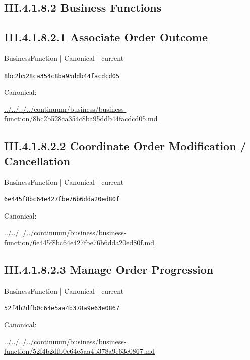 \documentclass[10pt,a4paper]{article}
\begin{document}
\subsection*{III.4.1.8.2 Business Functions}
\subsection*{III.4.1.8.2.1 Associate Order Outcome}
\label{element-8bc2b528ca354c8ba95ddb44facdcd05}
{\small BusinessFunction | Canonical | current}\par
\texttt{8bc2b528ca354c8ba95ddb44facdcd05}\par
Canonical: \par
{\footnotesize\url{../../../../continuum/business/business-function/8bc2b528ca354c8ba95ddb44facdcd05.md}}\par
\subsection*{III.4.1.8.2.2 Coordinate Order Modification / Cancellation}
\label{element-6e445f8bc64e427fbe76b6dda20ed80f}
{\small BusinessFunction | Canonical | current}\par
\texttt{6e445f8bc64e427fbe76b6dda20ed80f}\par
Canonical: \par
{\footnotesize\url{../../../../continuum/business/business-function/6e445f8bc64e427fbe76b6dda20ed80f.md}}\par
\subsection*{III.4.1.8.2.3 Manage Order Progression}
\label{element-52f4b2dfb0c64e5aa4b378a9e63e0867}
{\small BusinessFunction | Canonical | current}\par
\texttt{52f4b2dfb0c64e5aa4b378a9e63e0867}\par
Canonical: \par
{\footnotesize\url{../../../../continuum/business/business-function/52f4b2dfb0c64e5aa4b378a9e63e0867.md}}\par
\end{document}
